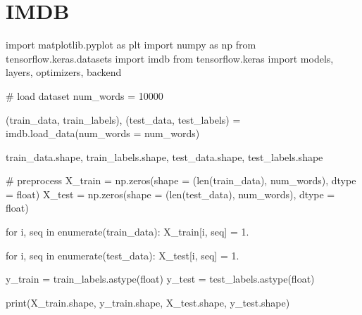 \documentclass[
  letterpaper,
  DIV=11,
  numbers=noendperiod]{scrreprt}
\newenvironment{Shaded}{\begin{snugshade}}{\end{snugshade}}
\newcommand{\BuiltInTok}[1]{\textcolor[rgb]{0.00,0.23,0.31}{#1}}
\newcommand{\CommentTok}[1]{\textcolor[rgb]{0.37,0.37,0.37}{#1}}
\newcommand{\ControlFlowTok}[1]{\textcolor[rgb]{0.00,0.23,0.31}{#1}}
\newcommand{\DecValTok}[1]{\textcolor[rgb]{0.68,0.00,0.00}{#1}}
\newcommand{\FloatTok}[1]{\textcolor[rgb]{0.68,0.00,0.00}{#1}}
\newcommand{\ImportTok}[1]{\textcolor[rgb]{0.00,0.46,0.62}{#1}}
\newcommand{\KeywordTok}[1]{\textcolor[rgb]{0.00,0.23,0.31}{#1}}
\newcommand{\NormalTok}[1]{\textcolor[rgb]{0.00,0.23,0.31}{#1}}
\newcommand{\OperatorTok}[1]{\textcolor[rgb]{0.37,0.37,0.37}{#1}}
\begin{document}
\hypertarget{imdb}{%
\chapter{IMDB}\label{imdb}}

\begin{Shaded}
\begin{Highlighting}[]
\ImportTok{import}\NormalTok{ matplotlib.pyplot }\ImportTok{as}\NormalTok{ plt}
\ImportTok{import}\NormalTok{ numpy }\ImportTok{as}\NormalTok{ np}
\ImportTok{from}\NormalTok{ tensorflow.keras.datasets }\ImportTok{import}\NormalTok{ imdb}
\ImportTok{from}\NormalTok{ tensorflow.keras }\ImportTok{import}\NormalTok{ models, layers, optimizers, backend}
\end{Highlighting}
\end{Shaded}

\begin{Shaded}
\begin{Highlighting}[]
\CommentTok{\# load dataset}
\NormalTok{num\_words }\OperatorTok{=} \DecValTok{10000}

\NormalTok{(train\_data, train\_labels), (test\_data, test\_labels) }\OperatorTok{=}\NormalTok{ imdb.load\_data(num\_words }\OperatorTok{=}\NormalTok{ num\_words)}

\NormalTok{train\_data.shape, train\_labels.shape, test\_data.shape, test\_labels.shape}
\end{Highlighting}
\end{Shaded}

\begin{Shaded}
\begin{Highlighting}[]
\CommentTok{\# preprocess}
\NormalTok{X\_train }\OperatorTok{=}\NormalTok{ np.zeros(shape }\OperatorTok{=}\NormalTok{ (}\BuiltInTok{len}\NormalTok{(train\_data), num\_words), dtype }\OperatorTok{=} \BuiltInTok{float}\NormalTok{)}
\NormalTok{X\_test }\OperatorTok{=}\NormalTok{ np.zeros(shape }\OperatorTok{=}\NormalTok{ (}\BuiltInTok{len}\NormalTok{(test\_data), num\_words), dtype }\OperatorTok{=} \BuiltInTok{float}\NormalTok{)}

\ControlFlowTok{for}\NormalTok{ i, seq }\KeywordTok{in} \BuiltInTok{enumerate}\NormalTok{(train\_data):}
\NormalTok{    X\_train[i, seq] }\OperatorTok{=} \FloatTok{1.}

\ControlFlowTok{for}\NormalTok{ i, seq }\KeywordTok{in} \BuiltInTok{enumerate}\NormalTok{(test\_data):}
\NormalTok{    X\_test[i, seq] }\OperatorTok{=} \FloatTok{1.}

\NormalTok{y\_train }\OperatorTok{=}\NormalTok{ train\_labels.astype(}\BuiltInTok{float}\NormalTok{)}
\NormalTok{y\_test }\OperatorTok{=}\NormalTok{ test\_labels.astype(}\BuiltInTok{float}\NormalTok{)}

\BuiltInTok{print}\NormalTok{(X\_train.shape, y\_train.shape, X\_test.shape, y\_test.shape)}
\end{Highlighting}
\end{Shaded}
\end{document}
